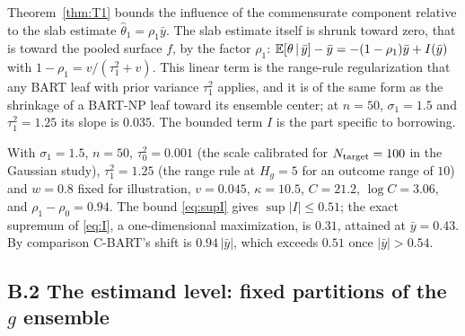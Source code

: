 \begin{remA}\label{rem:slabshrink}
Theorem~\ref{thm:T1} bounds the influence of the commensurate component relative to the slab estimate $\hat\theta_1=\rho_1\bar y$. The slab estimate itself is shrunk toward zero, that is toward the pooled surface $f$, by the factor $\rho_1$: $\mathbb{E}[\theta\,\vert\,\bar y]-\bar y=-(1-\rho_1)\bar y+I(\bar y)$ with $1-\rho_1=v/(\tau_1^2+v)$. This linear term is the range-rule regularization that any BART leaf with prior variance $\tau_1^2$ applies, and it is of the same form as the shrinkage of a BART-NP leaf toward its ensemble center; at $n=50$, $\sigma_1=1.5$ and $\tau_1^2=1.25$ its slope is $0.035$. The bounded term $I$ is the part specific to borrowing.
\end{remA}

\begin{remA}\label{rem:T1num}
With $\sigma_1=1.5$, $n=50$, $\tau_0^2=0.001$ (the scale calibrated for $N_{\rm target}=100$ in the Gaussian study), $\tau_1^2=1.25$ (the range rule at $H_g=5$ for an outcome range of $10$) and $w=0.8$ fixed for illustration, $v=0.045$, $\kappa=10.5$, $C=21.2$, $\log C=3.06$, and $\rho_1-\rho_0=0.94$. The bound \eqref{eq:supI} gives $\sup|I|\le0.51$; the exact supremum of \eqref{eq:I}, a one-dimensional maximization, is $0.31$, attained at $\bar y=0.43$. By comparison C-BART's shift is $0.94\,|\bar y|$, which exceeds $0.51$ once $|\bar y|>0.54$.
\end{remA}

\subsection*{B.2 The estimand level: fixed partitions of the $g$ ensemble}

